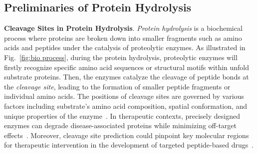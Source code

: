 \subsection{Preliminaries of Protein Hydrolysis}

\textbf{Cleavage Sites in Protein Hydrolysis}. \textit{Protein hydrolysis} is a biochemical process where proteins are broken down into smaller fragments such as amino acids and peptides under the catalysis of proteolytic enzymes. As illustrated in Fig.~\ref{fig:bio process}, during the protein hydrolysis, proteolytic enzymes will firstly recognize specific amino acid sequences or structural motifs within unfold substrate proteins. Then, the enzymes catalyze the cleavage of peptide bonds at the \textit{cleavage site}, leading to the formation of smaller peptide fragments or individual amino acids. The positions of cleavage sites are governed by various factors including substrate's amino acid composition, spatial conformation, and unique properties of the enzyme~\cite{MechanismsFunction, specificityandcatalysis, Turk2001}. 
In therapeutic contexts, precisely designed enzymes can degrade disease-associated proteins while minimizing off-target effects~\cite{TANDON2021102455, meghwanshi2020enzymes}. Moreover, cleavage site prediction could pinpoint key molecular regions for therapeutic intervention in the development of targeted peptide-based drugs~\cite{Radchenko2019}. 








